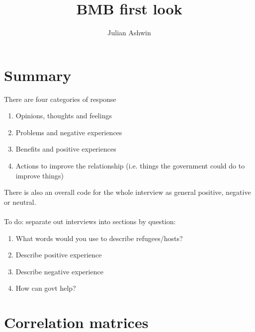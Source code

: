 \documentclass[]{article}
\title{BMB first look }
\author{Julian Ashwin}
\begin{document}
	
	\maketitle
	
	
	\tableofcontents
	
	
	
	\section{Summary}
	
	
	There are four categories of response
	\begin{enumerate}
		\item Opinions, thoughts and feelings
		\item Problems and negative experiences
		\item Benefits and positive experiences
		\item Actions to improve the relationship (i.e. things the government could do to improve things) 
	\end{enumerate}
	There is also an overall code for the whole interview as general positive, negative or neutral. 
	\\~\\
	To do: separate out interviews into sections by question:
	\begin{enumerate}
		\item What words would you use to describe refugees/hosts? 
		\item Describe positive experience
		\item Describe negative experience
		\item How can govt help?
	\end{enumerate}
	

\section{Correlation matrices}
\end{document}
